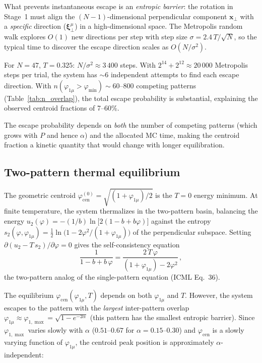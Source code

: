 \documentclass[11pt]{article}
\newcommand{\bxi}{\boldsymbol{\xi}}
\newcommand{\bx}{\mathbf{x}}
\begin{document}
What prevents instantaneous escape is an \emph{entropic barrier}: the rotation in Stage~1 must align the $(N\!-\!1)$-dimensional perpendicular component $\bx_\perp$ with a \emph{specific} direction ($\bxi^\mu_\perp$) in a high-dimensional space.  The Metropolis random walk explores $O(1)$ new directions per step with step size $\sigma = 2.4\,T/\!\sqrt{N}$, so the typical time to discover the escape direction scales as $O(N/\sigma^2)$.

For $N = 47$, $T = 0.325$: $N/\sigma^2 \approx 3\,400$ steps.  With $2^{14} + 2^{12} \approx 20\,000$ Metropolis steps per trial, the system has $\sim$6 independent attempts to find each escape direction.  With $n(\varphi_{1\mu} > \varphi_{\min}) \sim 60$--$800$ competing patterns (Table~\ref{tab:n_overlap}), the total escape probability is substantial, explaining the observed centroid fractions of 7--60\%.

The escape probability depends on \emph{both} the number of competing patterns (which grows with $P$ and hence $\alpha$) and the allocated MC time, making the centroid fraction a kinetic quantity that would change with longer equilibration.

\subsection{Two-pattern thermal equilibrium}
\label{sec:two_pat_eq}

The geometric centroid $\varphi_{\mathrm{cen}}^{(0)} = \sqrt{(1+\varphi_{1\mu})/2}$ is the $T = 0$ energy minimum.  At finite temperature, the system thermalizes in the two-pattern basin, balancing the energy $u_2(\varphi) = -(1/b)\ln\!\big[2(1-b+b\varphi)\big]$ against the entropy $s_2(\varphi,\varphi_{1\mu}) = \tfrac{1}{2}\ln\!\big(1 - 2\varphi^2/(1+\varphi_{1\mu})\big)$ of the perpendicular subspace.  Setting $\partial(u_2 - T\,s_2)/\partial\varphi = 0$ gives the self-consistency equation
\begin{equation}
\frac{1}{1 - b + b\,\varphi} = \frac{2\,T\,\varphi}{(1+\varphi_{1\mu}) - 2\varphi^2}\,,
\label{eq:two_pat_sc}
\end{equation}
the two-pattern analog of the single-pattern equation (ICML Eq.~36).

The equilibrium $\varphi_{\mathrm{cen}}(\varphi_{1\mu}, T)$ depends on both $\varphi_{1\mu}$ and $T$.  However, the system escapes to the pattern with the \emph{largest} inter-pattern overlap $\varphi_{1\mu} \approx \varphi_{1,\max} = \sqrt{1-e^{-2\alpha}}$ (this pattern has the smallest entropic barrier).  Since $\varphi_{1,\max}$ varies slowly with $\alpha$ ($0.51$--$0.67$ for $\alpha = 0.15$--$0.30$) and $\varphi_{\mathrm{cen}}$ is a slowly varying function of $\varphi_{1\mu}$, the centroid peak position is approximately $\alpha$-independent:
\end{document}
